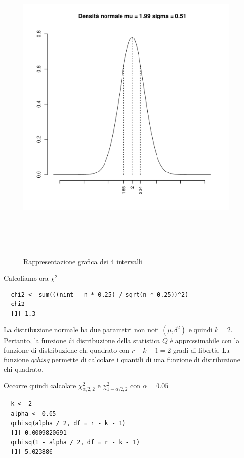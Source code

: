 \begin{figure}[!htbp]
    \centering
    \includegraphics[height=16cm]{capitoli/images/4_chiquadrato/densNorm.pdf}
    \caption{Rappresentazione grafica dei 4 intervalli}
\end{figure}

Calcoliamo ora $\chi^2$

\begin{lstlisting}
  chi2 <- sum(((nint - n * 0.25) / sqrt(n * 0.25))^2)
  chi2
  [1] 1.3
\end{lstlisting}

La distribuzione normale ha due parametri non noti $(\mu, \delta^2)$ e quindi $k=2$. Pertanto, la funzione di distribuzione della statistica $Q$ è approssimabile con la funzione di distribuzione chi-quadrato con $r-k-1=2$ gradi di libertà. La funzione $qchisq$ permette di calcolare i quantili di una funzione di distribuzione chi-quadrato.

Occorre quindi calcolare $\chi_{\alpha/2,2}^2$ e $\chi_{1-\alpha/2,2}^2$ con $\alpha = 0.05$

\begin{lstlisting}
  k <- 2
  alpha <- 0.05
  qchisq(alpha / 2, df = r - k - 1)
  [1] 0.0009820691
  qchisq(1 - alpha / 2, df = r - k - 1)
  [1] 5.023886
\end{lstlisting}


